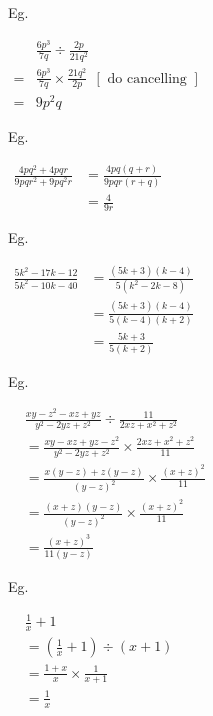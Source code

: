 \documentclass[twocolumn]{article}
\begin{document}
\bigskip 

\noindent 
Eg. 

\noindent 
$\begin{aligned} & \frac{6 p^3}{7 q} \div \frac{2 p}{21 q^2} \\ = & \frac{6 p^3}{7 q} \times \frac{21 q^2}{2 p} \ \ [\text { do cancelling }] \\ = & 9 p^2 q\end{aligned}$

\bigskip 

\noindent 
Eg. 

\noindent 
$\begin{aligned} \frac{4 p q^2+4 p q r}{9 p q r^2+9 p q^2 r} & =\frac{4 p q(q+r)}{9 p q r(r+q)} \\ & =\frac{4}{9 r}\end{aligned}$

\bigskip 

\bigskip 

\bigskip 

\bigskip 

\bigskip 

\bigskip 

\noindent 
Eg. 

\noindent 
$\begin{aligned} \frac{5 k^2-17 k-12}{5 k^2-10 k-40} & =\frac{(5 k+3)(k-4)}{5\left(k^2-2 k-8\right)} \\ & =\frac{(5 k+3)(k-4)}{5(k-4)(k+2)} \\ & =\frac{5 k+3}{5(k+2)}\end{aligned}$

\bigskip 

\noindent 
Eg. 

\noindent 
$\begin{aligned} & \frac{x y-z^2-x z+y z}{y^2-2 y z+z^2} \div \frac{11}{2 x z+x^2+z^2} \\ & =\frac{x y-x z+y z-z^2}{y^2-2 y z+z^2} \times \frac{2 x z+x^2+z^2}{11} \\ & =\frac{x(y-z)+z(y-z)}{(y-z)^2} \times \frac{(x+z)^2}{11} \\ & =\frac{(x+z)(y-z)}{(y-z)^2} \times \frac{(x+z)^2}{11} \\ & =\frac{(x+z)^3}{11(y-z)}\end{aligned}$

\bigskip 

\noindent 
Eg. 

\noindent 
$\begin{aligned} & \frac{1}{x}+1 \\ & =\left(\frac{1}{x}+1\right) \div(x+1) \\ & =\frac{1+x}{x} \times \frac{1}{x+1} \\ & =\frac{1}{x}\end{aligned}$
\end{document}
